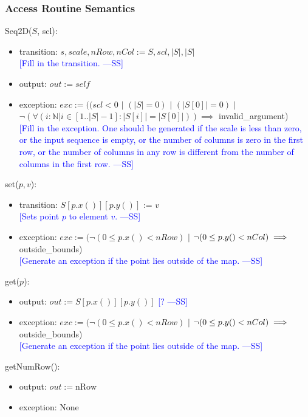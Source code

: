 \documentclass[12pt]{article}
\newcommand{\authornote}[3]{\textcolor{#1}{[#3 ---#2]}}
\newcommand{\authornote}[3]{}
\newcommand{\wss}[1]{\authornote{blue}{SS}{#1}}
\begin{document}
\subsubsection* {Access Routine Semantics}

Seq2D($S$, scl):
\begin{itemize}
\item transition: $s, scale, nRow, nCol := S, scl, |S|, |S|$\\
\wss{Fill in the transition.}
\item output: $\mathit{out} := \mathit{self}$
\item exception: $exc := ((scl < 0$ $|$ $(|S| = 0)$ $|$ $(|S[0]| = 0)$ $|$\\ $\lnot(\forall(i:\mathbb{N}|i\in[1..|S|-1]: |S[i]| = |S[0]|)) \implies$ invalid\_argument)\\
\wss{Fill in the exception.  One should be generated if the
    scale is less than zero, or the input sequence is empty, or the number of
    columns is zero in the first row, or the number of columns in any row is
    different from the number of columns in the first row.}
\end{itemize}

\noindent set($p, v$):
\begin{itemize}
\item transition: $S[p.x()][p.y()]$ := $v$\\
\wss{Sets point $p$ to element $v$.}
\item exception: $exc := (\lnot(0 \leq p.x() < nRow)$ $|$ $\lnot(0 \leq p.y() < nCol)\\ \implies$ outside\_bounds)\\
\wss{Generate an exception if the point lies outside of the
    map.}
\end{itemize}

\noindent get($p$):
\begin{itemize}
\item output: $out := S[p.x()][p.y()]$
\wss{?}
\item exception: $exc := (\lnot(0 \leq p.x() < nRow)$ $|$ $\lnot(0 \leq p.y() < nCol)\\ \implies$ outside\_bounds)\\
\wss{Generate an exception if the point lies outside of the
    map.}
\end{itemize}

\noindent getNumRow():
\begin{itemize}
\item output: $out := \mbox{nRow}$
\item exception: None
\end{itemize}
\end{document}
